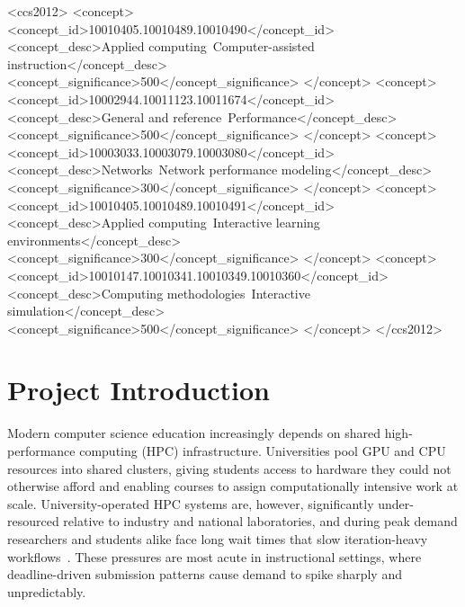 \documentclass[acmlarge]{acmart}
\begin{document}
\begin{CCSXML}
<ccs2012>
   <concept>
       <concept_id>10010405.10010489.10010490</concept_id>
       <concept_desc>Applied computing~Computer-assisted instruction</concept_desc>
       <concept_significance>500</concept_significance>
       </concept>
   <concept>
       <concept_id>10002944.10011123.10011674</concept_id>
       <concept_desc>General and reference~Performance</concept_desc>
       <concept_significance>500</concept_significance>
       </concept>
   <concept>
       <concept_id>10003033.10003079.10003080</concept_id>
       <concept_desc>Networks~Network performance modeling</concept_desc>
       <concept_significance>300</concept_significance>
       </concept>
   <concept>
       <concept_id>10010405.10010489.10010491</concept_id>
       <concept_desc>Applied computing~Interactive learning environments</concept_desc>
       <concept_significance>300</concept_significance>
       </concept>
   <concept>
       <concept_id>10010147.10010341.10010349.10010360</concept_id>
       <concept_desc>Computing methodologies~Interactive simulation</concept_desc>
       <concept_significance>500</concept_significance>
       </concept>
 </ccs2012>
\end{CCSXML}




\maketitle


\section{Project Introduction}

Modern computer science education increasingly depends on shared
high-performance computing (HPC) infrastructure. Universities pool GPU
and CPU resources into shared clusters, giving students access to
hardware they could not otherwise afford and enabling courses to assign
computationally intensive work at scale. University-operated HPC
systems are, however, significantly under-resourced relative to
industry and national laboratories, and during
peak demand researchers and students alike face long wait times that
slow iteration-heavy workflows~\cite{hpcsurvey2025}. These pressures
are most acute in instructional settings, where deadline-driven
submission patterns cause demand to spike sharply and unpredictably.
\end{document}
